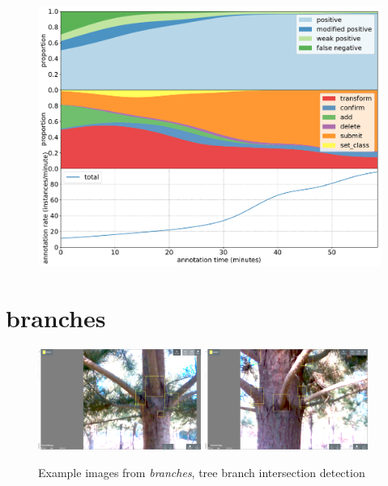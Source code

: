 \begin{figure}[!h]
\centering
\includegraphics[width=1.0\linewidth]{charts/action_annotations/fisheye.pdf}
\caption{  }
\label{fig:fisheye_annotation}
\end{figure}


\pagebreak
\section{branches}
\label{sec:branches_details}


\begin{figure}[!h]
  \includegraphics[width=0.475\textwidth]{figures/annotation/screenshots/branches3.png}
  \includegraphics[width=0.475\textwidth]{figures/annotation/screenshots/branches2.png}  
  
  \caption{Example images from \emph{branches}, tree branch intersection detection}
\end{figure}

